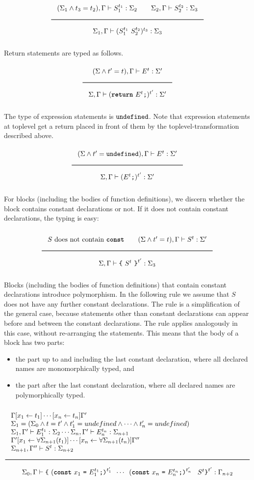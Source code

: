 \[
\Rule{
  (\Sigma_1 \wedge t_3 = t_2), \Gamma \vdash S_1^{t_1} : \Sigma_2 \qquad 
  \Sigma_2, \Gamma \vdash S_2^{t_2} : \Sigma_3}{
\Sigma_1, \Gamma \vdash (S_1^{t_1}\ S_2^{t_2})^{t_3}  : \Sigma_3}
\]

\noindent
Return statements are typed as follows.
\[
\Rule{
(\Sigma \wedge t' = t), \Gamma \vdash E^{t} : \Sigma' }{
\Sigma, \Gamma \vdash (\Return\ E^{t} \texttt{;})^{t'} : \Sigma'}
\]

\noindent
The type of expression statements is $\texttt{undefined}$. Note that expression statements
at toplevel get a return placed in front of them by the toplevel-transformation described above.
\[
\Rule{
(\Sigma \wedge t' = \Undefined), \Gamma \vdash E^{t} : \Sigma' }{
\Sigma, \Gamma \vdash (E^{t} \texttt{;})^{t'} : \Sigma'}
\]

\noindent
For blocks (including the bodies of function definitions), we discern whether the
block contains constant declarations or not. If it does not contain constant
declarations, the typing is easy:

\[
\Rule{
  S\ \textrm{does not contain }\Const \qquad
  (\Sigma \wedge t' = t), \Gamma \vdash S^{t} : \Sigma' }{
\Sigma, \Gamma \vdash \Lc \ S^{t} \ \Rc^{t'}  : \Sigma_3}
\]

\noindent
Blocks (including the bodies of function definitions) that 
contain constant declarations introduce polymorphism. In the following
rule we assume that $S$ does not have any further constant declarations. The rule
is a simplification of the general case, because statements other than constant
declarations can appear before and between the constant declarations. The rule
applies analogously in this case, without re-arranging the statements. This means
that the body of a block has two parts:
\begin{itemize}
\item the part up to and including the last constant declaration, where all
  declared names are monomorphically typed, and
\item the part after the last constant declaration, where all declared names
  are polymorphically typed.
\end{itemize}

\[
\Rule{
  \begin{minipage}{120mm}
    $\Gamma[x_1 \leftarrow t_1]\cdots[x_n \leftarrow t_n]\Gamma' $\\
    $\Sigma_1 = (\Sigma_0 \wedge t = t' \wedge t'_1 = undefined \wedge \cdots \wedge t'_n = undefined)$ \\
    $\Sigma_1, \Gamma' \vdash E_1^{t_1} : \Sigma_2 \cdots
     \Sigma_n, \Gamma' \vdash E_n^{t_n} : \Sigma_{n+1}$\\
    $\Gamma'[x_1 \leftarrow \forall \Sigma_{n+1}(t_1)]\cdots[x_n \leftarrow \forall \Sigma_{n+1}(t_n)]\Gamma'' $\\
    $\Sigma_{n+1}, \Gamma'' \vdash S^t : \Sigma_{n+2}$
  \end{minipage}
}{
  \Sigma_0, \Gamma \vdash \Lc\
  (\Const\ x_1 \ \texttt{=}\ E_1^{t_1} \texttt{;)}^{t'_1} \texttt{ } \cdots \texttt{ }
  (\Const\ x_n \ \texttt{=}\ E_n^{t_n} \texttt{;)}^{t'_n} \texttt{ } \ S^t \Rc^{t'} : \Gamma_{n+2}
}
\]


